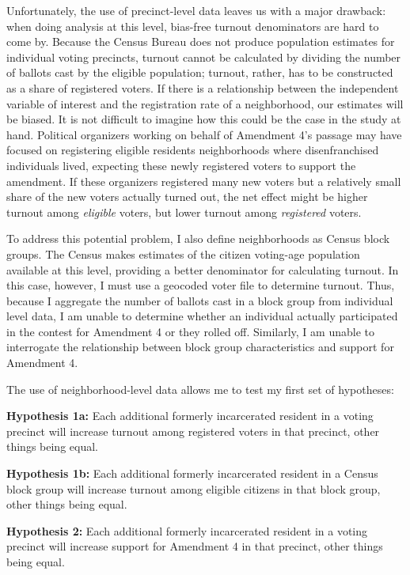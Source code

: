 \documentclass[
  12pt,
]{article}
\begin{document}
Unfortunately, the use of precinct-level data leaves us with a major drawback: when doing analysis at this level, bias-free turnout denominators are hard to come by. Because the Census Bureau does not produce population estimates for individual voting precincts, turnout cannot be calculated by dividing the number of ballots cast by the eligible population; turnout, rather, has to be constructed as a share of registered voters. If there is a relationship between the independent variable of interest and the registration rate of a neighborhood, our estimates will be biased. It is not difficult to imagine how this could be the case in the study at hand. Political organizers working on behalf of Amendment 4's passage may have focused on registering eligible residents neighborhoods where disenfranchised individuals lived, expecting these newly registered voters to support the amendment. If these organizers registered many new voters but a relatively small share of the new voters actually turned out, the net effect might be higher turnout among \emph{eligible} voters, but lower turnout among \emph{registered} voters.

To address this potential problem, I also define neighborhoods as Census block groups. The Census makes estimates of the citizen voting-age population available at this level, providing a better denominator for calculating turnout. In this case, however, I must use a geocoded voter file to determine turnout. Thus, because I aggregate the number of ballots cast in a block group from individual level data, I am unable to determine whether an individual actually participated in the contest for Amendment 4 or they rolled off. Similarly, I am unable to interrogate the relationship between block group characteristics and support for Amendment 4.

The use of neighborhood-level data allows me to test my first set of hypotheses:

\textbf{Hypothesis 1a:} Each additional formerly incarcerated resident in a voting precinct will increase turnout among registered voters in that precinct, other things being equal.

\textbf{Hypothesis 1b:} Each additional formerly incarcerated resident in a Census block group will increase turnout among eligible citizens in that block group, other things being equal.

\textbf{Hypothesis 2:} Each additional formerly incarcerated resident in a voting precinct will increase support for Amendment 4 in that precinct, other things being equal.
\end{document}
